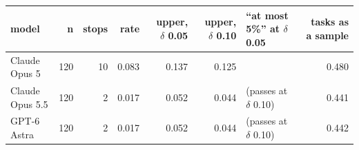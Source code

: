 \begin{tabular}{@{}l r r r r r p{2.6cm} r@{}}
\toprule
\textbf{model} & \textbf{n} & \textbf{stops} & \textbf{rate} & \textbf{upper, $\delta$ 0.05} & \textbf{upper, $\delta$ 0.10} & \textbf{``at most 5\%'' at $\delta$ 0.05} & \textbf{tasks as a sample} \\
\midrule
Claude Opus 5 & 120 & 10 & 0.083 & 0.137 & 0.125 & \NSF{} & 0.480 \\
Claude Opus 5.5 & 120 & 2 & 0.017 & 0.052 & 0.044 & \NSF{} (passes at $\delta$ 0.10) & 0.441 \\
GPT-6 Astra & 120 & 2 & 0.017 & 0.052 & 0.044 & \NSF{} (passes at $\delta$ 0.10) & 0.442 \\
\bottomrule
\end{tabular}
